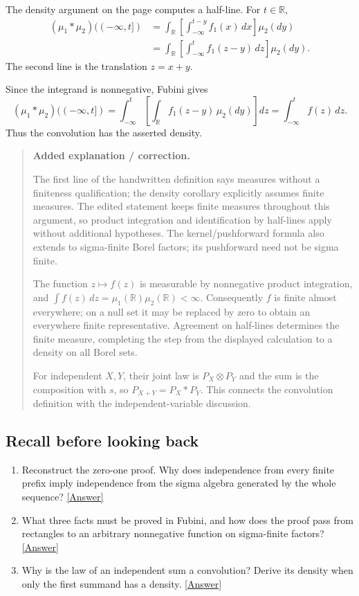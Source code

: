 \documentclass[11pt,letterpaper]{article}
\begin{document}
The density argument on the page computes a half-line. For $t\in\mathbb R$, \[\begin{aligned}(\mu_1*\mu_2)(({-\infty},t])&=\int_{\mathbb R}\left[\int_{-\infty}^{t-y}f_1(x)\,dx\right]\mu_2(dy)\\&=\int_{\mathbb R}\left[\int_{-\infty}^{t}f_1(z-y)\,dz\right]\mu_2(dy).\end{aligned}\] The second line is the translation $z=x+y$.

Since the integrand is nonnegative, Fubini gives \[ (\mu_1*\mu_2)(({-\infty},t])=\int_{-\infty}^{t}\left[\int_{\mathbb R}f_1(z-y)\,\mu_2(dy)\right]dz=\int_{-\infty}^{t}f(z)\,dz.\] Thus the convolution has the asserted density.

\begin{quote}\small\textbf{Added explanation / correction.}

The first line of the handwritten definition says measures without a finiteness qualification; the density corollary explicitly assumes finite measures. The edited statement keeps finite measures throughout this argument, so product integration and identification by half-lines apply without additional hypotheses. The kernel/pushforward formula also extends to sigma-finite Borel factors; its pushforward need not be sigma finite.

The function $z\mapsto f(z)$ is measurable by nonnegative product integration, and $\int f(z)\,dz=\mu_1(\mathbb R)\mu_2(\mathbb R)<\infty$. Consequently $f$ is finite almost everywhere; on a null set it may be replaced by zero to obtain an everywhere finite representative. Agreement on half-lines determines the finite measure, completing the step from the displayed calculation to a density on all Borel sets.

For independent $X,Y$, their joint law is $P_X\otimes P_Y$ and the sum is the composition with $s$, so $P_{X+Y}=P_X*P_Y$. This connects the convolution definition with the independent-variable discussion.
\end{quote}

\subsection*{Recall before looking back}
\begin{enumerate}
\item Reconstruct the zero-one proof. Why does independence from every finite prefix imply independence from the sigma algebra generated by the whole sequence? \hyperlink{answer-l8-s3}{[Answer]}
\item What three facts must be proved in Fubini, and how does the proof pass from rectangles to an arbitrary nonnegative function on sigma-finite factors? \hyperlink{answer-l8-s9}{[Answer]}
\item Why is the law of an independent sum a convolution? Derive its density when only the first summand has a density. \hyperlink{answer-l8-s12}{[Answer]}
\end{enumerate}
\end{document}
